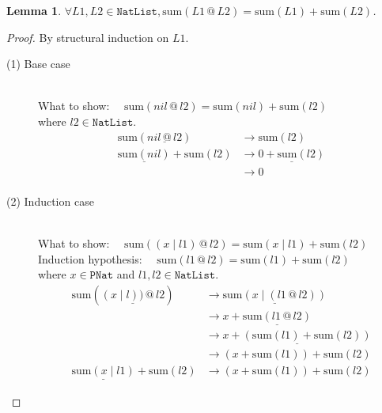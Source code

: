 \documentclass[12pt, a4paper]{article}
\newtheorem{lemma}[theorem]{Lemma}
\newcommand{\rel}[1]{\mathrel{#1}}
\newcommand{\rmx}[1]{\mathrm{#1}}
\newcommand{\larrow}{\longrightarrow}
\newcommand{\under}{\underline}
\begin{document}
\begin{lemma}
\label{lm1}
$\forall L1, L2 \in \mathtt{NatList}, \rmx{sum}(L1 \rel{@} L2) = \rmx{sum}(L1) + \rmx{sum}(L2)$.
\end{lemma}
\begin{proof}
By structural induction on $L1$.

\begin{description}
\item[(1) Base case]~\\
\noindent
What to show: $\quad \rmx{sum}(nil \rel{@} l2) = \rmx{sum}(nil) + \rmx{sum}(l2)$ \\
where $l2 \in \mathtt{NatList}$. \\
\begin{align*}
\rmx{sum}(\under{nil \rel{@} l2}) 
	&\larrow \rmx{sum}(l2)  \tag{by @1} \\
\under{\rmx{sum}(nil)} + \rmx{sum}(l2)
	&\larrow \under{0 + \rmx{sum}(l2)} \tag{by sum1} \\
	&\larrow 0 \tag{by +1} \\
\end{align*}

\item[(2) Induction case]~\\
What to show: $\quad \rmx{sum}((x \mid l1) \rel{@} l2) = \rmx{sum}(x \mid l1) + \rmx{sum}(l2)$ \\
Induction hypothesis: $\quad \rmx{sum}(l1 \rel{@} l2) = \rmx{sum}(l1) + \rmx{sum}(l2)$  \\
where $x \in \mathtt{PNat}$ and $l1, l2 \in \mathtt{NatList}$. \\
\begin{align*}
\rmx{sum}(\under{(x \mid l)) \rel{@} l2})
	&\larrow \under{\rmx{sum}(x \mid (l1 \rel{@} l2))} \tag{by @2} \\
	&\larrow x + \under{\rmx{sum}(l1 \rel{@} l2)} \tag{by sum2} \\
	&\larrow \under{x + (\rmx{sum}(l1) + \rmx{sum}(l2))} \tag{by IH} \\
	&\larrow (x + \rmx{sum}(l1)) + \rmx{sum}(l2) \tag{by assoc+} \\
\under{\rmx{sum}(x \mid l1)} + \rmx{sum}(l2)
	&\larrow (x + \rmx{sum}(l1)) + \rmx{sum}(l2) \tag{by sum2}
\end{align*}
\end{description}
\end{proof}
\end{document}
